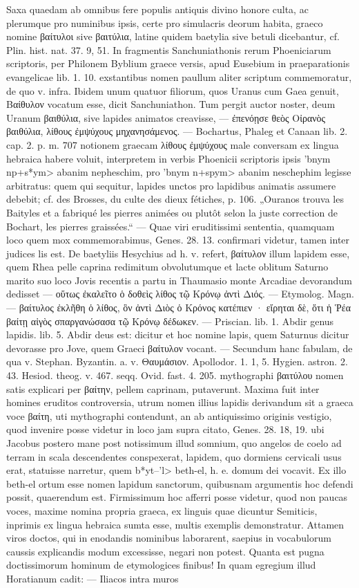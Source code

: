 \documentclass[a4paper, 11pt, oneside, polutonikogreek, german]{article}
\begin{document}
Saxa quaedam ab omnibus fere populis antiquis divino honore culta, ac plerumque pro numinibus ipsis, certe pro simulacris deorum habita, graeco nomine βαίτυλοι sive βαιτύλια, latine quidem baetylia sive betuli dicebantur, cf. Plin. hist. nat. 37. 9, 51. In fragmentis Sanchuniathonis rerum Phoeniciarum scriptoris, per Philonem Byblium graece versis, apud Eusebium in praeparationis evangelicae lib. 1. 10. exstantibus nomen paullum aliter scriptum commemoratur, de quo v. infra. Ibidem unum quatuor filiorum, quos Uranus cum Gaea genuit, Βαίθυλον vocatum esse, dicit Sanchuniathon. Tum pergit auctor noster, deum Uranum βαιθύλια, sive lapides animatos creavisse, --- ἐπενόῃσε θεὸς Οἰρανὸς βαιθύλια, λίθους ἐμψύχους μηχανησάμενος. --- Bochartus, Phaleg et Canaan lib. 2. cap. 2. p. m. 707 notionem graecam λίθους ἐμψύχους male conversam ex lingua hebraica habere voluit, interpretem in verbis Phoenicii scriptoris ipsis \<'bnym np+s*ym> abanim nepheschim, pro \<'bnym n+spym> abanim neschephim legisse arbitratus: quem qui sequitur, lapides unctos pro lapidibus animatis assumere debebit; cf. des Brosses, du culte des dieux fétiches, p. 106. „Ouranos trouva les Baityles et a fabriqué les pierres animées ou plutôt selon la juste correction de Bochart, les pierres graissées.“ --- Quae viri eruditissimi sententia, quamquam loco quem mox commemorabimus, Genes. 28. 13. confirmari videtur, tamen inter judices lis est. De baetyliis Hesychius ad h. v. refert, βαίτυλον illum lapidem esse, quem Rhea pelle caprina redimitum obvolutumque et lacte oblitum Saturno marito suo loco Jovis recentis a partu in Thaumasio monte Arcadiae devorandum dedisset --- οὕτως ἐκαλεῖτο ὁ δοθεὶς λίθος τῷ Κρόνῳ ἀντὶ Διός. --- Etymolog. Magn. --- βαίτυλος ἐκλῆθη ὁ λίθος, ὃν ἀντὶ Διὸς ὁ Κρόνος κατέπιεν · εἴρηται δὲ, ὅτι ἡ Ῥέα βαίτῃ αἰγὸς σπαργανώσασα τῷ Κρόνῳ δέδωκεν. --- Priscian. lib. 1. Abdir genus lapidis. lib. 5. Abdir deus est: dicitur et hoc nomine lapis, quem Saturnus dicitur devorasse pro Jove, quem Graeci βαίτυλον vocant. --- Secundum hanc fabulam, de qua v. Stephan. Byzantin. a. v. Θαυμάσιον. Apollodor. 1. 1, 5. Hygien. astron. 2. 43. Hesiod. theog. v. 467. seqq. Ovid. fast. 4. 205. mythographi βαιτύλου nomen satis explicari per βαίτην, pellem caprinam, putaverunt. Maxima fuit inter homines eruditos controversia, utrum nomen illius lapidis derivandum sit a graeca voce βαίτη, uti mythographi contendunt, an ab antiquissimo originis vestigio, quod invenire posse videtur in loco jam supra citato, Genes. 28. 18, 19. ubi Jacobus postero mane post notissimum illud somnium, quo angelos de coelo ad terram in scala descendentes conspexerat, lapidem, quo dormiens cervicali usus erat, statuisse narretur, quem \<b*yt--'l> beth-el, h. e. domum dei vocavit. Ex illo beth-el ortum esse nomen lapidum sanctorum, quibusnam argumentis hoc defendi possit, quaerendum est. Firmissimum hoc afferri posse videtur, quod non paucas voces, maxime nomina propria graeca, ex linguis quae dicuntur Semiticis, inprimis ex lingua hebraica sumta esse, multis exemplis demonstratur. Attamen viros doctos, qui in enodandis nominibus laborarent, saepius in vocabulorum caussis explicandis modum excessisse, negari non potest. Quanta est pugna doctissimorum hominum de etymologices finibus! In quam egregium illud Horatianum cadit: --- Iliacos intra muros 
\end{document}
